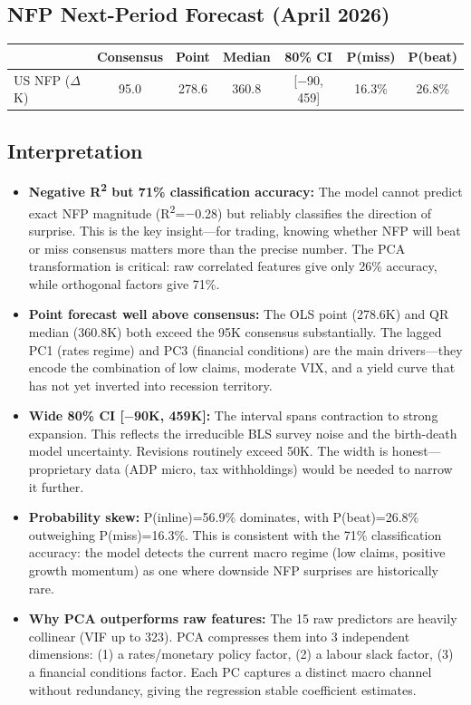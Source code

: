 \documentclass[11pt,a4paper]{article}
\begin{document}
\subsection*{NFP Next-Period Forecast (April 2026)}
\begin{table}[H]
\centering\small
\begin{tabular}{lcccccc}
\toprule
& \textbf{Consensus} & \textbf{Point} & \textbf{Median} & \textbf{80\% CI} & \textbf{P(miss)} & \textbf{P(beat)} \\
\midrule
US NFP ($\Delta$K) & 95.0 & 278.6 & 360.8 & [$-$90, 459] & 16.3\% & 26.8\% \\
\bottomrule
\end{tabular}
\end{table}
\subsection*{Interpretation}

\begin{itemize}[nosep, leftmargin=1.2em]
    \item \textbf{Negative R\textsuperscript{2} but 71\% classification accuracy:} The model cannot predict exact NFP magnitude (R\textsuperscript{2}=$-$0.28) but reliably classifies the direction of surprise. This is the key insight---for trading, knowing whether NFP will beat or miss consensus matters more than the precise number. The PCA transformation is critical: raw correlated features give only 26\% accuracy, while orthogonal factors give 71\%.
    \item \textbf{Point forecast well above consensus:} The OLS point (278.6K) and QR median (360.8K) both exceed the 95K consensus substantially. The lagged PC1 (rates regime) and PC3 (financial conditions) are the main drivers---they encode the combination of low claims, moderate VIX, and a yield curve that has not yet inverted into recession territory.
    \item \textbf{Wide 80\% CI [$-$90K, 459K]:} The interval spans contraction to strong expansion. This reflects the irreducible BLS survey noise and the birth-death model uncertainty. Revisions routinely exceed 50K. The width is honest---proprietary data (ADP micro, tax withholdings) would be needed to narrow it further.
    \item \textbf{Probability skew:} P(inline)=56.9\% dominates, with P(beat)=26.8\% outweighing P(miss)=16.3\%. This is consistent with the 71\% classification accuracy: the model detects the current macro regime (low claims, positive growth momentum) as one where downside NFP surprises are historically rare.
    \item \textbf{Why PCA outperforms raw features:} The 15 raw predictors are heavily collinear (VIF up to 323). PCA compresses them into 3 independent dimensions: (1) a rates/monetary policy factor, (2) a labour slack factor, (3) a financial conditions factor. Each PC captures a distinct macro channel without redundancy, giving the regression stable coefficient estimates.
\end{itemize}
\end{document}
